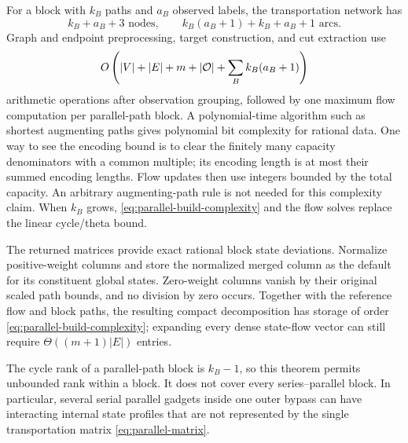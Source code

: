 For a block with $k_B$ paths and $a_B$ observed labels, the transportation
network has
\begin{equation}\label{eq:transport-size}
 k_B+a_B+3\text{ nodes},\qquad
 k_B(a_B+1)+k_B+a_B+1\text{ arcs}.
\end{equation}
Graph and endpoint preprocessing, target construction, and cut extraction
use
\begin{equation}\label{eq:parallel-build-complexity}
 O\left(|V|+|E|+m+|\mathcal O|+\sum_B k_B(a_B+1)\right)
\end{equation}
arithmetic operations after observation grouping, followed by one maximum
flow computation per parallel-path block. A polynomial-time algorithm
such as shortest augmenting paths \citep{EdmondsKarp1972} gives polynomial
bit complexity for rational data. One way to see the encoding bound is
to clear the finitely many capacity denominators with a common multiple;
its encoding length is at most their summed encoding lengths. Flow
updates then use integers bounded by the total capacity. An arbitrary
augmenting-path rule is not needed for this complexity claim. When
$k_B$ grows, \eqref{eq:parallel-build-complexity} and the flow solves
replace the linear cycle/theta bound.

The returned matrices provide exact rational block state deviations.
Normalize positive-weight columns and store the normalized merged column
as the default for its constituent global states. Zero-weight columns
vanish by their original scaled path bounds, and no division by zero
occurs. Together with the reference flow and block paths, the resulting
compact decomposition has storage of order
\eqref{eq:parallel-build-complexity}; expanding every dense state-flow
vector can still require $\Theta((m+1)|E|)$ entries.

The cycle rank of a parallel-path block is $k_B-1$, so this theorem
permits unbounded rank within a block. It does not cover every
series--parallel block. In particular, several serial parallel gadgets
inside one outer bypass can have interacting internal state profiles
that are not represented by the single transportation matrix
\eqref{eq:parallel-matrix}.
